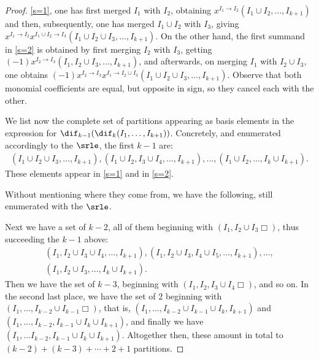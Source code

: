 \begin{proof}
\eqref{s=1}, one has first merged $I_1$ with $I_2$, obtaining
$x^{I_1\to I_2}(I_1\cup I_2,\ldots ,I_{k+1})$ and then, subsequently,
one has merged $I_1\cup I_2$ with $I_3$, giving $x^{I_1\to
  I_2}x^{I_1\cup I_2\to I_3}(I_1\cup I_2\cup I_3,\ldots ,I_{k+1})$. On
the other hand, the first summand in \eqref{s=2} is obtained by first
merging $I_2$ with $I_3$, getting $(-1)x^{I_2\to I_3}(I_1,I_2\cup
I_3,\ldots ,I_{k+1})$, and afterwards, on merging $I_1$ with $I_2\cup
I_3$, one obtains $(-1)x^{I_2\to I_3}x^{I_1\to I_2\cup I_3}(I_1\cup
I_2\cup I_3,\ldots ,I_{k+1})$. Observe that both monomial coefficients
are equal, but opposite in sign, so they cancel each with the other.

We list now the complete set of partitions appearing as basis elements
in the expression for
$\dif_{k-1}(\dif_{k}(I_1,\ldots,I_{k+1}))$. Concretely, and enumerated
accordingly to the $\srle$, the first $k-1$ are:
\begin{eqnarray*}
(I_1\cup I_2\cup I_3,\ldots ,I_{k+1}),(I_1\cup I_2,I_3\cup I_4,\ldots
  ,I_{k+1}),\ldots ,(I_1\cup I_2,\ldots , I_k\cup I_{k+1}).
\end{eqnarray*}
These elements appear in \eqref{s=1} and in \eqref{s=2}. 

Without mentioning where they come from, we have the following, still
enumerated with the $\srle$.

Next we have a set of $k-2$, all of them beginning with $(I_1,I_2\cup
I_3\Box)$, thus succeeding the $k-1$ above:
\begin{multline*}
(I_1,I_2\cup I_3\cup I_4,\ldots ,I_{k+1}), (I_1,I_2\cup I_3, I_4\cup
  I_5,\ldots ,I_{k+1}),\ldots ,\\ (I_1,I_2\cup I_3,\ldots ,I_k\cup I_{k+1}).
\end{multline*}
Then we have the set of $k-3$, beginning with $(I_1,I_2,I_3\cup
I_4\Box)$, and so on. In the second last place, we have the set of $2$
beginning with $(I_1,\ldots ,I_{k-2}\cup I_{k-1}\Box)$, that is,
$(I_1,\ldots ,I_{k-2}\cup I_{k-1}\cup I_{k},I_{k+1})$ and $(I_1,\ldots
,I_{k-2},I_{k-1}\cup I_{k}\cup I_{k+1})$, and finally we have $(I_1,\ldots
I_{k-2}, I_{k-1}\cup I_{k}\cup I_{k+1})$. Altogether then, these
amount in total to $(k-2)+(k-3)+\cdots +2+1$ partitions.


\end{proof}
